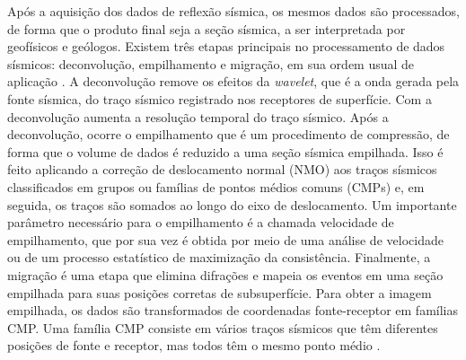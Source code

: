 Após a aquisição dos dados de reflexão sísmica, os mesmos dados são processados, de forma que o produto final seja a seção sísmica, a ser interpretada por geofísicos e geólogos. Existem três etapas principais no processamento de dados sísmicos: deconvolução, empilhamento e migração, em sua ordem usual de aplicação \citep{ylmaz1987seismic}. A deconvolução remove os efeitos da \textit{wavelet}, que é a onda gerada pela fonte sísmica, do traço sísmico registrado nos receptores de superfície. Com a deconvolução aumenta a resolução temporal do traço sísmico. Após a deconvolução, ocorre o empilhamento que é um procedimento de compressão, de forma que o volume de dados é reduzido a uma seção sísmica empilhada. Isso é feito aplicando a correção de deslocamento normal (NMO) aos traços sísmicos classificados em grupos ou famílias de pontos médios comuns (CMPs) e, em seguida, os traços são somados ao longo do eixo de deslocamento. Um importante parâmetro necessário para o empilhamento é a chamada velocidade de empilhamento, que por sua vez é obtida por meio de uma análise de velocidade ou de um processo estatístico de maximização da consistência. Finalmente, a migração é uma etapa que elimina difrações e mapeia os eventos em uma seção empilhada para suas posições corretas de subsuperfície. Para obter a imagem empilhada, os dados são transformados de coordenadas fonte-receptor em famílias CMP. Uma família CMP consiste em vários traços sísmicos que têm diferentes posições de fonte e receptor, mas todos têm o mesmo ponto médio \citep{ortega2020non}.